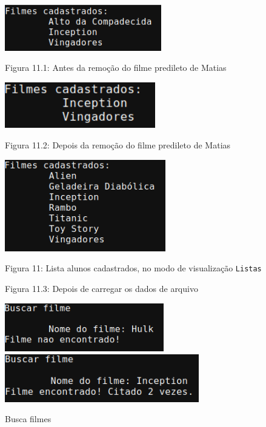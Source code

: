 \documentclass[12pt,a4paper,portuguese]{article}
\begin{document}
        \begin{figure}[H]
            \centering
            \includegraphics[height=2cm]{imgs/lista_filmes_LISTAS_1.png}
            \vspace{-10px}
            \caption*{Figura 11.1: Antes da remoção do filme predileto de Matias}
            \includegraphics[height=2cm]{imgs/lista_filmes_LISTAS_2.png}
            \vspace{-10px}
            \caption*{Figura 11.2: Depois da remoção do filme predileto de Matias}
            \includegraphics[height=4cm]{imgs/lista_filmes_LISTAS_3.png}
            \vspace{-10px}
            \caption*{Figura 11.3: Depois de carregar os dados de arquivo}
            Figura 11: Lista alunos cadastrados, no modo de visualização \texttt{Listas}
        \end{figure}

        \setcounter{figure}{11}

        \begin{figure}[H]
            \centering
            \includegraphics[height=2.1cm]{imgs/busca_filme_1.png}
            \includegraphics[height=2.1cm]{imgs/busca_filme_2.png}
            \caption{Busca filmes}
        \end{figure}
\end{document}

